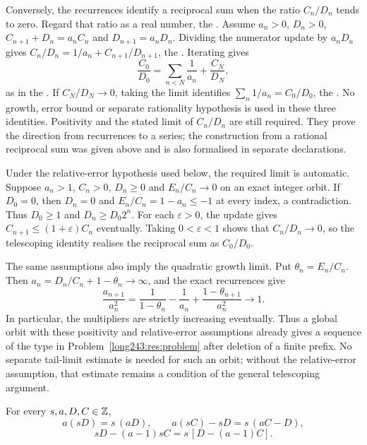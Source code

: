 \documentclass[11pt]{article}
\begin{document}
Conversely, the recurrences identify a reciprocal sum when the ratio
$C_n/D_n$ tends to zero. Regard that ratio as a real number, the
.
Assume $a_n>0$, $D_n>0$, $C_{n+1}+D_n=a_nC_n$ and
$D_{n+1}=a_nD_n$. Dividing the numerator update by $a_nD_n$ gives
$C_n/D_n=1/a_n+C_{n+1}/D_{n+1}$, the
. Iterating gives
\[
 \frac{C_0}{D_0}=\sum_{n<N}\frac1{a_n}+\frac{C_N}{D_N},
\]
as in the . If $C_N/D_N\to0$, taking the limit identifies
$\sum_n1/a_n=C_0/D_0$, the
.  No growth, error bound or separate rationality hypothesis is used in
these three identities. Positivity and the stated limit of $C_n/D_n$
are still required. They prove the direction from recurrences to a series;
the construction from a rational reciprocal sum was given above and is
also formalised in separate declarations.

Under the relative-error hypothesis used below, the required limit is
automatic. Suppose $a_n>1$, $C_n>0$, $D_n\ge0$ and $E_n/C_n\to0$ on an
exact integer orbit. If $D_0=0$, then $D_n=0$ and
$E_n/C_n=1-a_n\le-1$ at every index, a contradiction. Thus $D_0\ge1$ and
$D_n\ge D_0 2^n$. For each $\varepsilon>0$, the update gives
$C_{n+1}\le(1+\varepsilon)C_n$ eventually. Taking $0<\varepsilon<1$
shows that $C_n/D_n\to0$, so the telescoping identity realises the
reciprocal sum as $C_0/D_0$.

The same assumptions also imply the quadratic growth limit. Put
$\theta_n=E_n/C_n$. Then $a_n=D_n/C_n+1-\theta_n\to\infty$, and the
exact recurrences give
\[
 \frac{a_{n+1}}{a_n^2}
 =\frac1{1-\theta_n}-\frac1{a_n}
   +\frac{1-\theta_{n+1}}{a_n^2}\longrightarrow1.
\]
In particular, the multipliers are strictly increasing eventually.
Thus a global orbit with these positivity and relative-error assumptions
already gives a sequence of the type in Problem~\ref{long243:res:problem}
after deletion of a finite prefix. No separate tail-limit estimate is
needed for such an orbit; without the relative-error assumption, that
estimate remains a condition of the general telescoping argument.

\begin{proposition}\label{long243:res:scale}
For every $s,a,D,C\in\mathbb{Z}$,
\[
 a(sD)=s\,(aD),\qquad
 a(sC)-sD=s\,(aC-D),
\]
\[
 sD-(a-1)sC=s\,[D-(a-1)C].
\]
\end{proposition}
\end{document}
